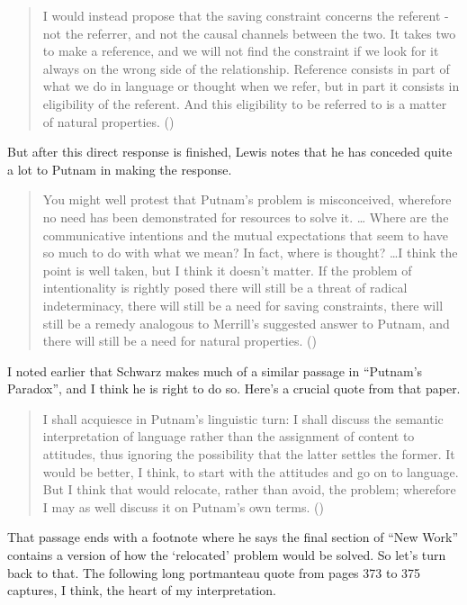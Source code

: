 \documentclass[
  10pt,
  letterpaper,
  DIV=11,
  numbers=noendperiod,
  twoside]{scrartcl}
\begin{document}
\begin{quote}
I would instead propose that the saving constraint concerns the referent
- not the referrer, and not the causal channels between the two. It
takes two to make a reference, and we will not find the constraint if we
look for it always on the wrong side of the relationship. Reference
consists in part of what we do in language or thought when we refer, but
in part it consists in eligibility of the referent. And this eligibility
to be referred to is a matter of natural properties.
()
\end{quote}

But after this direct response is finished, Lewis notes that he has
conceded quite a lot to Putnam in making the response.

\begin{quote}
You might well protest that Putnam's problem is misconceived, wherefore
no need has been demonstrated for resources to solve it. \ldots{} Where
are the communicative intentions and the mutual expectations that seem
to have so much to do with what we mean? In fact, where is thought?
\ldots I think the point is well taken, but I think it doesn't matter.
If the problem of intentionality is rightly posed there will still be a
threat of radical indeterminacy, there will still be a need for saving
constraints, there will still be a remedy analogous to Merrill's
suggested answer to Putnam, and there will still be a need for natural
properties. ()
\end{quote}

I noted earlier that Schwarz makes much of a similar passage in
``Putnam's Paradox'', and I think he is right to do so. Here's a crucial
quote from that paper.

\begin{quote}
I shall acquiesce in Putnam's linguistic turn: I shall discuss the
semantic interpretation of language rather than the assignment of
content to attitudes, thus ignoring the possibility that the latter
settles the former. It would be better, I think, to start with the
attitudes and go on to language. But I think that would relocate, rather
than avoid, the problem; wherefore I may as well discuss it on Putnam's
own terms. ()
\end{quote}

That passage ends with a footnote where he says the final section of
``New Work'' contains a version of how the `relocated' problem would be
solved. So let's turn back to that. The following long portmanteau quote
from pages 373 to 375 captures, I think, the heart of my interpretation.
\end{document}
